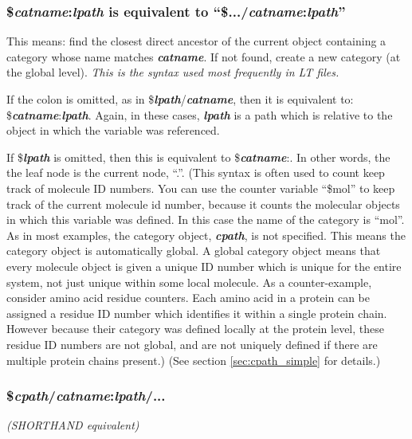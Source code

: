 \documentclass[11pt]{article}
\begin{document}
\subsubsection*{\$\textit{\textbf{catname}}:\textit{\textbf{lpath}} is equivalent to ``\$.../\textit{\textbf{catname}}:\textit{\textbf{lpath}}''}
This means: find the closest direct ancestor of the current object containing a category whose name matches \textit{\textbf{catname}}.  If not found, create a new category (at the global level).  \textit{This is the syntax used most frequently in LT files.}

If the colon is omitted, as in \$\textit{\textbf{lpath}}/\textit{\textbf{catname}}, 
then it is equivalent to: \$\textit{\textbf{catname}}:\textit{\textbf{lpath}}.
Again, in these cases, \textit{\textbf{lpath}} is a path which is relative to the object
in which the variable was referenced.

If \$\textit{\textbf{lpath}} is omitted, then this is equivalent to \$\textit{\textbf{catname}}:.  In other words, the the leaf node is the current node, ``.''.  (This syntax is often used to count keep track of molecule ID numbers.  You can use the counter variable ``\$mol'' to keep track of the current molecule id number, because it counts the molecular objects in which this variable was defined.  In this case the name of the category is ``mol''.  As in most examples, the category object, \textit{\textbf{cpath}}, is not specified.  This means the category object is automatically global.  A global category object means that every molecule object is given a unique ID number which is unique for the entire system, not just unique within some local molecule.  As a counter-example, consider amino acid residue counters.  Each amino acid in a protein can be assigned a residue ID number which identifies it within a single protein chain.   However because their category was defined locally at the protein level, these residue ID numbers are not global, and are not uniquely defined if there are multiple protein chains present.)  (See section \ref{sec:cpath_simple} for details.)



\subsubsection*{\$\textit{\textbf{cpath}}/\textit{\textbf{catname}}:\textit{\textbf{lpath}}/...}
\textit{(SHORTHAND equivalent)}
\end{document}

